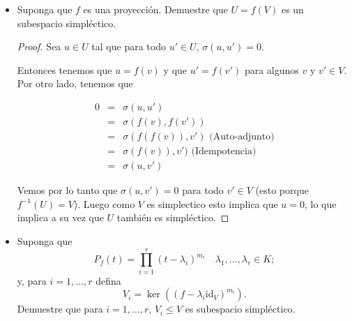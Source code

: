 \documentclass[letter,twoside,12pt]{article}
\newcommand{\id}{\textrm{id}}
\begin{document}
\begin{itemize}
\begin{proof}
Por lo que cualquier combinación lineal de operadores auto-adjuntos es auto-adjunto.

Ahora sea $ f $ un operador auto-adjunto y $ n \in \mathbb{N} $ y considere $ f^n = \underbrace{f \circ \cdots \circ f}_\text{$n$- veces} $.

Vamos a demostrar por inducción que $ f^n $ es auto-adjunto. Para el caso base observese que si $ n=0 $ entonces $ f^0=id $ y $ \sigma(id(u),v)=\sigma(u,id(v)) $. Ahora para el paso inductivo asuma que $ f^{n-1} $ es auto-adjunto. Entonces

\begin{eqnarray}
\sigma(f^{n}(u),v)&=&\sigma(f(f^{n-1}(u)),v) \nonumber
\\&=&\sigma(f^{n-1}(u),f(v)) \nonumber
\\&=&\sigma(u,f^{n-1}(f(v))) \nonumber
\\&=&\sigma(u,f^n(v)) \nonumber
\end{eqnarray} 

Por lo tanto, $ f^n $ también es auto-adjunto.
\end{proof}

\item Suponga que $f$ es una proyecci\'on. Demuestre que $U=f(V)$ es un subespacio simpl\'ectico.

\begin{proof}
Sea $ u \in U $ tal que para todo $ u' \in U $, $ \sigma(u,u')=0 $.

Entonces tenemos que $ u = f(v)$ y que $ u' = f(v') $ para algunos $ v $ y $ v' \in V $. Por otro lado, tenemos que

\begin{eqnarray}
0 &=& \sigma(u,u') \nonumber
\\&=& \sigma(f(v),f(v')) \nonumber
\\&=&\sigma(f(f(v)),v') \text{ (Auto-adjunto)} \nonumber 
\\&=&\sigma(f(v)),v') \text{ (Idempotencia)} \nonumber 
\\&=&\sigma(u,v') \nonumber
\end{eqnarray}

Vemos por lo tanto que $ \sigma(u,v')=0 $ para todo $ v' \in V $ (esto porque $ f^{-1}(U)=V $). Luego como $ V $ es simplectico esto implica que $ u = 0 $, lo que implica a su vez que $ U $ también es simpléctico.
\end{proof}

\item Suponga que $$P_f(t)=\prod_{i=1}^r (t-\lambda_i)^{m_i}\quad \lambda_1,\ldots,\lambda_r\in K;$$ y, para $i=1,\ldots,r$ defina $$V_i=\ker\left((f-\lambda_i\id_V)^{m_i}\right).$$ Demuestre que para $i=1,\ldots,r$, $V_i\le V$ es subespacio simpléctico.


\end{itemize}
\end{document}
